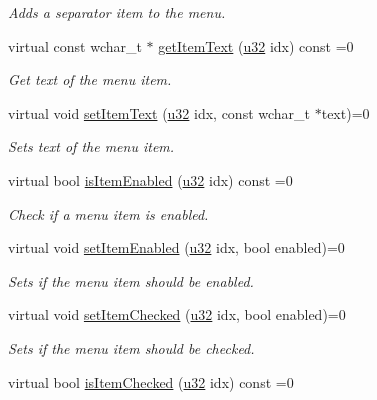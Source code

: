 \begin{DoxyCompactItemize}
\begin{DoxyCompactList}\small\item\em Adds a separator item to the menu. \end{DoxyCompactList}\item 
virtual const wchar\+\_\+t $\ast$ \hyperlink{classirr_1_1gui_1_1IGUIContextMenu_a18cf836d001f425f617c5a36db3d1ae6}{get\+Item\+Text} (\hyperlink{namespaceirr_a0416a53257075833e7002efd0a18e804}{u32} idx) const =0
\begin{DoxyCompactList}\small\item\em Get text of the menu item. \end{DoxyCompactList}\item 
virtual void \hyperlink{classirr_1_1gui_1_1IGUIContextMenu_a20d0e53213a2915a8a62c54b5aa2ff08}{set\+Item\+Text} (\hyperlink{namespaceirr_a0416a53257075833e7002efd0a18e804}{u32} idx, const wchar\+\_\+t $\ast$text)=0
\begin{DoxyCompactList}\small\item\em Sets text of the menu item. \end{DoxyCompactList}\item 
virtual bool \hyperlink{classirr_1_1gui_1_1IGUIContextMenu_a0064345c63e1f8e124e64ca96eb486e2}{is\+Item\+Enabled} (\hyperlink{namespaceirr_a0416a53257075833e7002efd0a18e804}{u32} idx) const =0
\begin{DoxyCompactList}\small\item\em Check if a menu item is enabled. \end{DoxyCompactList}\item 
virtual void \hyperlink{classirr_1_1gui_1_1IGUIContextMenu_aa3c36d6cd990f3b488be2c7f419b89ee}{set\+Item\+Enabled} (\hyperlink{namespaceirr_a0416a53257075833e7002efd0a18e804}{u32} idx, bool enabled)=0
\begin{DoxyCompactList}\small\item\em Sets if the menu item should be enabled. \end{DoxyCompactList}\item 
virtual void \hyperlink{classirr_1_1gui_1_1IGUIContextMenu_a8abbd1587dcc462f60660d7e606e954e}{set\+Item\+Checked} (\hyperlink{namespaceirr_a0416a53257075833e7002efd0a18e804}{u32} idx, bool enabled)=0
\begin{DoxyCompactList}\small\item\em Sets if the menu item should be checked. \end{DoxyCompactList}\item 
virtual bool \hyperlink{classirr_1_1gui_1_1IGUIContextMenu_a0ff910b79e5581a97aee8ec9a0679160}{is\+Item\+Checked} (\hyperlink{namespaceirr_a0416a53257075833e7002efd0a18e804}{u32} idx) const =0

\end{DoxyCompactItemize}
